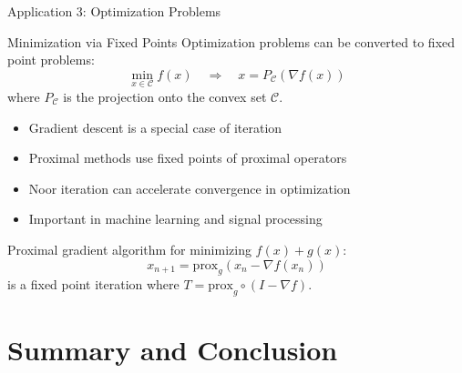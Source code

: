 \documentclass[aspectratio=169,10pt]{beamer}
\begin{document}
\begin{frame}{Application 3: Optimization Problems}

\begin{block}{Minimization via Fixed Points}
Optimization problems can be converted to fixed point problems:
$$\min_{x \in \mathcal{C}} f(x) \quad \Rightarrow \quad x = P_\mathcal{C}(\nabla f(x))$$
where $P_\mathcal{C}$ is the projection onto the convex set $\mathcal{C}$.
\end{block}

\vspace{0.3cm}

\begin{itemize}
  \item Gradient descent is a special case of iteration
  \item Proximal methods use fixed points of proximal operators
  \item Noor iteration can accelerate convergence in optimization
  \item Important in machine learning and signal processing
\end{itemize}

\vspace{0.3cm}

\begin{example}
Proximal gradient algorithm for minimizing $f(x) + g(x)$:
$$x_{n+1} = \text{prox}_{g}(x_n - \nabla f(x_n))$$
is a fixed point iteration where $T = \text{prox}_g \circ (I - \nabla f)$.
\end{example}

\end{frame}


\section{Summary and Conclusion}
\end{document}
